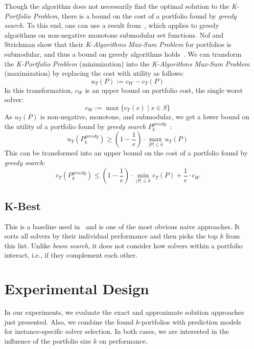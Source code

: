 \documentclass[runningheads]{llncs}
\begin{document}
Though the algorithm does not necessarily find the optimal solution to the \emph{K-Portfolio Problem}, there is a bound on the cost of a portfolio found by \emph{greedy search}. 
To this end, one can use a result from~\cite{nemhauser1978analysis}, which applies to greedy algorithms on non-negative monotone submodular set functions.
Nof and Strichman show that their \emph{K-Algorithms Max-Sum Problem} for portfolios is submodular, and thus a bound on greedy algorithms holds~\cite{nof2020real}. 
We can transform the \emph{K-Portfolio Problem} (minimization) into the \emph{K-Algorithms Max-Sum Problem} (maximization) by replacing the cost with utility as follows:%
$$
u_{T}(P) := c_W - c_{T}(P)
$$
In this transformation, $c_W$ is an upper bound on portfolio cost, the single worst solver:%
$$
c_W := \max\{c_T(s) \mid s \in S\}
$$
As $u_{T}(P)$ is non-negative, monotone, and submodular, we get a lower bound on the utility of a portfolio found by \emph{greedy search} $P_k^{greedy}$~\cite{nemhauser1978analysis,krause2014submodular}:%
$$
	u_{T}(P_k^{greedy}) \geq (1 - \frac{1}{e}) \cdot \max_{|P| \leq k}{u_{T}(P)}
$$
This can be transformed into an upper bound on the cost of a portfolio found by \emph{greedy search}:%
\begin{equation}
	c_{T}(P_k^{greedy}) \leq (1 - \frac{1}{e}) \cdot \min_{|P| \leq k}{c_{T}(P)} + \frac{1}{e} \cdot c_W
	\label{eq:upper-bound}
\end{equation}

\subsection{K-Best}
\label{sec:approach:k-best}

This is a baseline used in~\cite{nof2020real} and is one of the most obvious naive approaches. 
It sorts all solvers by their individual performance and then picks the top $k$ from this list.
Unlike \emph{beam search}, it does not consider how solvers within a portfolio interact, i.e., if they complement each other.

\section{Experimental Design}
\label{sec:experimental-design}

In our experiments, we evaluate the exact and approximate solution approaches just presented.
Also, we combine the found $k$-portfolios with prediction models for instance-specific solver selection. 
In both cases, we are interested in the influence of the portfolio size $k$ on performance. 
\end{document}
